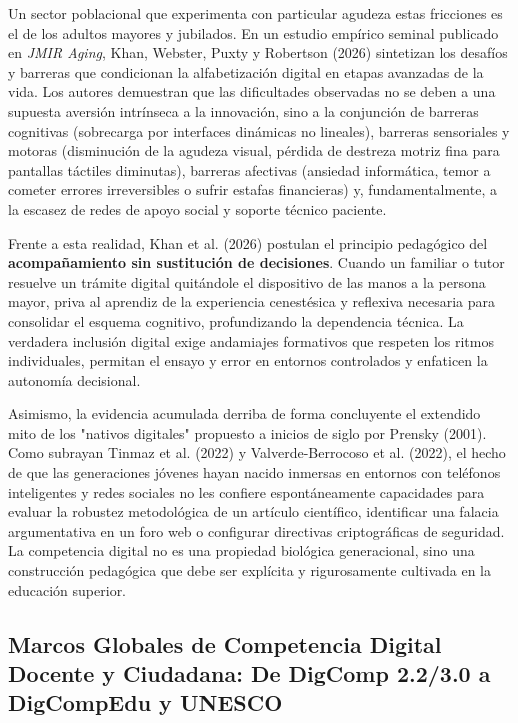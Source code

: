Un sector poblacional que experimenta con particular agudeza estas fricciones es el de los adultos mayores y jubilados. En un estudio empírico seminal publicado en \textit{JMIR Aging}, Khan, Webster, Puxty y Robertson (2026) sintetizan los desafíos y barreras que condicionan la alfabetización digital en etapas avanzadas de la vida. Los autores demuestran que las dificultades observadas no se deben a una supuesta aversión intrínseca a la innovación, sino a la conjunción de barreras cognitivas (sobrecarga por interfaces dinámicas no lineales), barreras sensoriales y motoras (disminución de la agudeza visual, pérdida de destreza motriz fina para pantallas táctiles diminutas), barreras afectivas (ansiedad informática, temor a cometer errores irreversibles o sufrir estafas financieras) y, fundamentalmente, a la escasez de redes de apoyo social y soporte técnico paciente.

Frente a esta realidad, Khan et al. (2026) postulan el principio pedagógico del \textbf{acompañamiento sin sustitución de decisiones}. Cuando un familiar o tutor resuelve un trámite digital quitándole el dispositivo de las manos a la persona mayor, priva al aprendiz de la experiencia cenestésica y reflexiva necesaria para consolidar el esquema cognitivo, profundizando la dependencia técnica. La verdadera inclusión digital exige andamiajes formativos que respeten los ritmos individuales, permitan el ensayo y error en entornos controlados y enfaticen la autonomía decisional.

Asimismo, la evidencia acumulada derriba de forma concluyente el extendido mito de los "nativos digitales" propuesto a inicios de siglo por Prensky (2001). Como subrayan Tinmaz et al. (2022) y Valverde-Berrocoso et al. (2022), el hecho de que las generaciones jóvenes hayan nacido inmersas en entornos con teléfonos inteligentes y redes sociales no les confiere espontáneamente capacidades para evaluar la robustez metodológica de un artículo científico, identificar una falacia argumentativa en un foro web o configurar directivas criptográficas de seguridad. La competencia digital no es una propiedad biológica generacional, sino una construcción pedagógica que debe ser explícita y rigurosamente cultivada en la educación superior.

\newpage

\subsection{Marcos Globales de Competencia Digital Docente y Ciudadana: De DigComp 2.2/3.0 a DigCompEdu y UNESCO}

